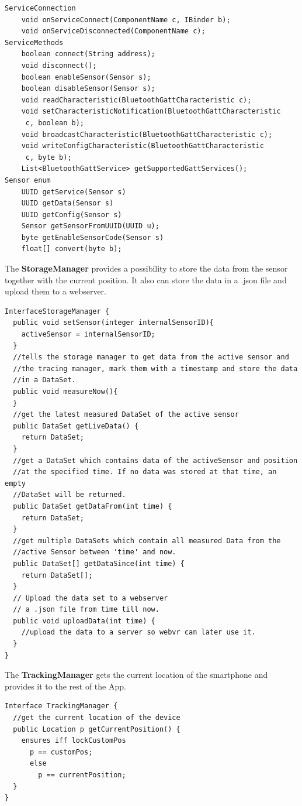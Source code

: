 \begin{lstlisting}
ServiceConnection
	void onServiceConnect(ComponentName c, IBinder b);
	void onServiceDisconnected(ComponentName c);
ServiceMethods
	boolean connect(String address);
	void disconnect();
	boolean enableSensor(Sensor s);
	boolean disableSensor(Sensor s);
	void readCharacteristic(BluetoothGattCharacteristic c);
	void setCharacteristicNotification(BluetoothGattCharacteristic
	 c, boolean b);
	void broadcastCharacteristic(BluetoothGattCharacteristic c);
	void writeConfigCharacteristic(BluetoothGattCharacteristic
	 c, byte b);
	List<BluetoothGattService> getSupportedGattServices();
Sensor enum
	UUID getService(Sensor s)
	UUID getData(Sensor s)
	UUID getConfig(Sensor s)
	Sensor getSensorFromUUID(UUID u);
	byte getEnableSensorCode(Sensor s)
	float[] convert(byte b);
\end{lstlisting}

\noindent The \textbf{StorageManager} provides a possibility to store the data from the sensor together with the current position.
It also can store the data in a .json file and upload them to a webserver.

\begin{lstlisting}
InterfaceStorageManager {
  public void setSensor(integer internalSensorID){
    activeSensor = internalSensorID;
  }
  //tells the storage manager to get data from the active sensor and
  //the tracing manager, mark them with a timestamp and store the data
  //in a DataSet.
  public void measureNow(){
  }
  //get the latest measured DataSet of the active sensor
  public DataSet getLiveData() {
    return DataSet;
  }
  //get a DataSet which contains data of the activeSensor and position
  //at the specified time. If no data was stored at that time, an empty
  //DataSet will be returned.
  public DataSet getDataFrom(int time) {
    return DataSet;
  }
  //get multiple DataSets which contain all measured Data from the
  //active Sensor between 'time' and now.
  public DataSet[] getDataSince(int time) {
    return DataSet[];
  }
  // Upload the data set to a webserver
  // a .json file from time till now.
  public void uploadData(int time) {
    //upload the data to a server so webvr can later use it.
  }
}
\end{lstlisting}


The \textbf{TrackingManager} gets the current location of the smartphone and provides it to the rest of
the App.

\begin{lstlisting}
Interface TrackingManager {
  //get the current location of the device
  public Location p getCurrentPosition() {
    ensures iff lockCustomPos
      p == customPos;
      else
        p == currentPosition;
  }
}
\end{lstlisting}


